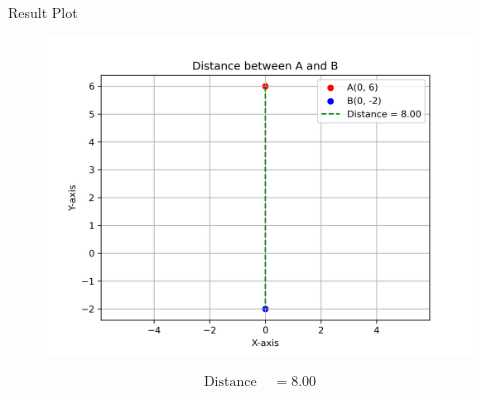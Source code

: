 \documentclass{beamer}
\numberwithin{equation}{section}
\theoremstyle{remark}
\begin{document}
\begin{frame}{Result Plot}
 \begin{figure}[H]
     \centering
     \includegraphics[width=0.5\columnwidth]{figs/fig1.png}
     \caption*{}
     \label{fig:fig1}
 \end{figure}
  \begin{align}
    \text{Distance } &= 8.00
  \end{align}
\end{frame}
\end{document}
